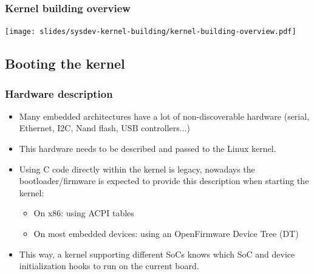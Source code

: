 \begin{frame}
  \frametitle{Kernel building overview}
  \begin{center}
    \texttt{[image: slides/sysdev-kernel-building/kernel-building-overview.pdf]}
  \end{center}
\end{frame}

\subsection{Booting the kernel}

\begin{frame}
  \frametitle{Hardware description}
  \begin{itemize}
  \item Many embedded architectures have a lot of non-discoverable
    hardware (serial, Ethernet, I2C, Nand flash, USB controllers...)
  \item This hardware needs to be described and passed to the Linux
    kernel.
  \item Using C code directly within the kernel is legacy, nowadays the
    bootloader/firmware is expected to provide this description when
    starting the kernel:
    \begin{itemize}
    \item On x86: using ACPI tables
    \item On most embedded devices: using an OpenFirmware Device Tree
      (DT)
    \end{itemize}
  \item This way, a kernel supporting different SoCs knows which
    SoC and device initialization hooks to run on the current board.
  \end{itemize}
\end{frame}
